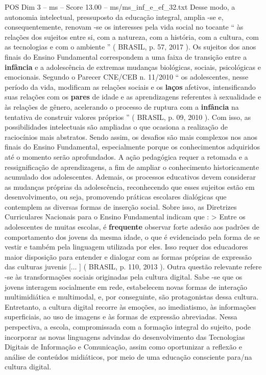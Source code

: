 \begin{textsample}{POS Dim 3 – ms – Score 13.00 – ms/ms\_inf\_e\_ef\_32.txt}
Desse modo, a autonomia intelectual, pressuposto da educação integral, amplia -se e, consequentemente, renovam -se os interesses pela vida social no tocante “ às relações dos sujeitos entre si, com a natureza, com a história, com a cultura, com as tecnologias e com o ambiente ” ( BRASIL, p. 57, 2017 ).
Os sujeitos dos anos finais do Ensino Fundamental correspondem a uma faixa de transição entre a \textbf{infância} e a adolescência de extremas mudanças biológicas, sociais, psicológicas e emocionais.
Segundo o Parecer CNE/CEB n. 11/2010 “ os adolescentes, nesse período da vida, modificam as relações sociais e os \textbf{laços} afetivos, intensificando suas relações com os \textbf{pares} de idade e as aprendizagens referentes à sexualidade e às relações de gênero, acelerando o processo de ruptura com a \textbf{infância} na tentativa de construir valores próprios ” ( BRASIL, p. 09, 2010 ).
Com isso, as possibilidades intelectuais são ampliadas o que ocasiona a realização de raciocínios mais abstratos.
Sendo assim, os desafios são mais complexos nos anos finais do Ensino Fundamental, especialmente porque os conhecimentos adquiridos até o momento serão aprofundados.
A ação pedagógica requer a retomada e a ressignificação de aprendizagens, a fim de ampliar o conhecimento historicamente acumulado dos adolescentes.
Ademais, os processos educativos devem considerar as mudanças próprias da adolescência, reconhecendo que esses sujeitos estão em desenvolvimento, ou seja, promovendo práticas escolares dialógicas que contemplem as diversas formas de inserção social.
Sobre isso, as Diretrizes Curriculares Nacionais para o Ensino Fundamental indicam que : > Entre os adolescentes de muitas escolas, é \textbf{frequente} observar forte adesão aos padrões de comportamento dos jovens da mesma idade, o que é evidenciado pela forma de se vestir e também pela linguagem utilizada por eles.
Isso requer dos educadores maior disposição para entender e dialogar com as formas próprias de expressão das culturas juvenis [... ] ( BRASIL, p. 110, 2013 ).
Outra questão relevante refere -se às transformações sociais originadas pela cultura digital.
Sabe -se que os jovens interagem socialmente em rede, estabelecem novas formas de interação multimidiática e multimodal, e, por conseguinte, são protagonistas dessa cultura.
Entretanto, a cultura digital recorre às emoções, ao imediatismo, às informações superficiais, ao uso de imagens e às formas de expressão abreviadas.
Nessa perspectiva, a escola, compromissada com a formação integral do sujeito, pode incorporar as novas linguagens advindas do desenvolvimento das Tecnologias Digitais de Informação e Comunicação, assim como oportunizar a reflexão e análise de conteúdos midiáticos, por meio de uma educação consciente para/na cultura digital.

\end{textsample}

